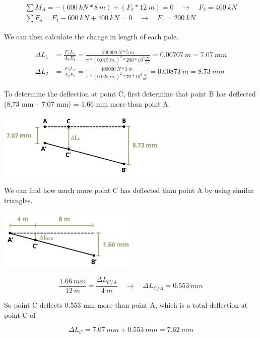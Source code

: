 \documentclass[
  letterpaper,
  DIV=11,
  numbers=noendperiod]{scrreprt}
\begin{document}
\begin{tcolorbox}
\begin{tcolorbox}
\[
\begin{gathered}
\sum M_A=-(600{~kN}* 8{~m})+(F_2 * 12{~m})=0 \quad\rightarrow\quad F_2=400{~kN} \\
\sum F_y=F_1-600{~kN}+400{~kN}=0 \quad\rightarrow\quad F_1=200{~kN}
\end{gathered}
\]

We can then calculate the change in length of each pole.

\[
\begin{aligned}
\Delta L_1 & =\frac{F_1 L_1}{A_1 E_1}=\frac{200000{~N} * 5{~m}}{\pi * (0.015{~in.})^2 * 200 * 10^9\frac{N}{m^2}}=0.00707{~m}=7.07{~mm} \\
\Delta L_2 & =\frac{F_2 L_2}{A_2 E_2}=\frac{400000{~N} * 3{~m}}{\pi * (0.025{~in.})^2 * 70 * 10^9\frac{N}{m^2}}=0.00873{~m}=8.73{~mm}
\end{aligned}
\]

To determine the deflection at point C, first determine that point B has
deflected (8.73 mm -- 7.07 mm) = 1.66 mm more than point A.

\begin{center}
\includegraphics[width=3.23958in,height=\textheight]{images/PNGs/Example 5.4 part 3.png}
\end{center}

We can find how much more point C has deflected than point A by using
similar triangles.

\begin{center}
\includegraphics[width=2.63542in,height=\textheight]{images/PNGs/Example 5.4 part 4.png}
\end{center}

\[
\frac{1.66{~mm}}{12{~m}}=\frac{\Delta L_{C / A}}{4{~m}} \quad\rightarrow\quad \Delta L_{C / A}=0.553{~mm}
\]

So point C deflects 0.553 mm more than point A, which is a total
deflection at point C of

\[
\Delta L_C=7.07{~mm}+0.553{~mm}=7.62{~mm}
\]

\end{tcolorbox}

\end{tcolorbox}
\end{document}
